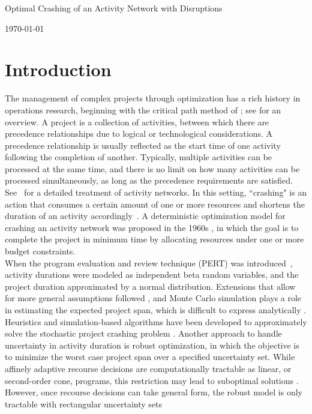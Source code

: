 \documentclass[11pt]{article}
\newcommand{\ms}{\medskip}
\begin{document}
	\baselineskip0.25in
	
	\begin{center}
		\begin{large}
			\begin{bf}
				
				Optimal Crashing of an Activity Network with Disruptions \ms
				
				\today \ms
			\end{bf}
		\end{large}
	\end{center}

	\section{Introduction} \label{sec:introduction}
		The management of complex projects through optimization has a rich history in operations research, beginning with the critical path method of \citep{kelley1961criticalpath}; see \citet{soderlund2004building} for an overview. A project is a collection of activities, between which there are precedence relationships due to logical or technological considerations. A precedence relationship is usually reflected as the start time of one activity following the completion of another. Typically, multiple activities can be processed at the same time, and there is no limit on how many activities can be processed simultaneously, as long as the precedence requirements are satisfied. See~\citet{Elmaghraby77} for a detailed treatment of activity networks. In this setting, ``crashing" is an action that consumes a certain amount of one or more resources and shortens the duration of an activity accordingly~\citep{kuhl2008dynamic}. A deterministic optimization model for crashing an activity network was proposed in the 1960s \citep{fulkerson1961network, kelley1961criticalpath}, in which the goal is to complete the project in minimum time by allocating resources under one or more budget constraints.\\
		\newline
		When the program evaluation and review technique (PERT) was introduced~\citep{malcolm1959application}, activity durations were modeled as independent beta random variables, and the project duration approximated by a normal distribution. Extensions that allow for more general assumptions followed \citep{Elmaghraby77}, and Monte Carlo simulation plays a role in estimating the expected project span, which is difficult to express analytically \citep{burt1971conditional,van1963letter}. Heuristics and simulation-based algorithms have been developed to approximately solve the stochastic project crashing problem \citep{aghaie2009ant, bowman1994stochastic, ke2014genetic, kim2007heuristic}. Another approach to handle uncertainty in activity duration is robust optimization, in which the objective is to minimize the worst case project span over a specified uncertainty set. While affinely adaptive recourse decisions are computationally tractable as linear, or second-order cone, programs, this restriction may lead to suboptimal solutions \citep{chen2008linear, cohen2007stochastic}. However, once recourse decisions can take general form, the robust model is only tractable with rectangular uncertainty sets
\end{document}
